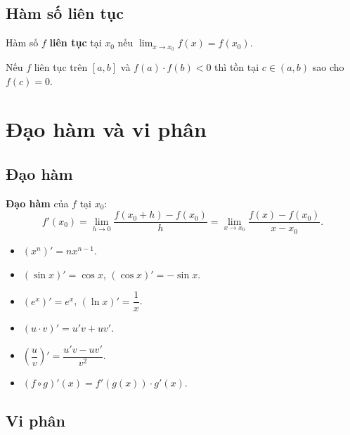 \documentclass[12pt,a4paper]{article}
\begin{document}
\subsection{Hàm số liên tục}

\begin{dinhnghia}
  Hàm số $f$ \textbf{liên tục} tại $x_0$ nếu $\displaystyle\lim_{x \to x_0} f(x) = f(x_0)$.
\end{dinhnghia}

\begin{dinhly}[title={Định lý giá trị trung gian}]
  Nếu $f$ liên tục trên $[a,b]$ và $f(a) \cdot f(b) < 0$ thì tồn tại $c \in (a,b)$ sao cho $f(c) = 0$.
\end{dinhly}

\section{Đạo hàm và vi phân}

\subsection{Đạo hàm}

\begin{dinhnghia}
  \textbf{Đạo hàm} của $f$ tại $x_0$:
  \[
    f'(x_0) = \lim_{h \to 0} \frac{f(x_0 + h) - f(x_0)}{h} = \lim_{x \to x_0} \frac{f(x) - f(x_0)}{x - x_0}.
  \]
\end{dinhnghia}

\begin{congthuc}[title={Đạo hàm cơ bản}]
  \begin{itemize}
    \item $(x^n)' = n x^{n-1}$.
    \item $(\sin x)' = \cos x$, $(\cos x)' = -\sin x$.
    \item $(e^x)' = e^x$, $(\ln x)' = \dfrac{1}{x}$.
    \item $(u \cdot v)' = u'v + uv'$.
    \item $\left(\dfrac{u}{v}\right)' = \dfrac{u'v - uv'}{v^2}$.
    \item $(f \circ g)'(x) = f'(g(x)) \cdot g'(x)$.
  \end{itemize}
\end{congthuc}

\subsection{Vi phân}
\end{document}
